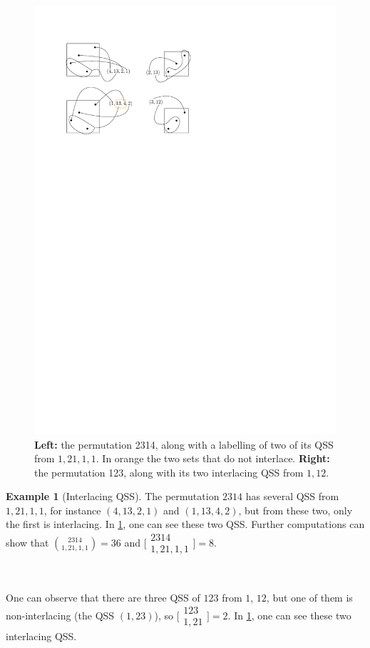 \documentclass[12pt, reqno]{amsart}
\theoremstyle{definition}
\newtheorem{smpl}[thm]{Example}
\begin{document}
\begin{figure}[h]
    \centering
    \includegraphics{../images/interlacing_25314_square.pdf}
    \caption{\textbf{Left:} the permutation 2314, along with a labelling of two of its QSS from $1, 21, 1, 1$. In orange the two sets that do not interlace. \textbf{Right:} the permutation 123, along with its two interlacing QSS from $1, 12$.\label{fig:interlacingQSSsmpl}}
\end{figure}


\begin{smpl}[Interlacing QSS]
The permutation $2314$ has several QSS from $1, 21, 1, 1$, for instance $(4, 13, 2, 1)$ and $(1, 13, 4, 2)$, but from these two, only the first is interlacing.
In \cref{fig:interlacingQSSsmpl}, one can see these two QSS.
Further computations can show that $\binom{2314}{1, 21, 1, 1} = 36$ and $\bigl[\!\begin{smallmatrix} 2314 \\ 1, 21, 1, 1 \end{smallmatrix}\!\bigr] = 8$.

\

One can observe that there are three QSS of $123$ from $1$, $12$, but one of them is non-interlacing (the QSS $(1,23)$), so
$\bigl[\!\begin{smallmatrix} 123 \\ 1, 21 \end{smallmatrix}\!\bigr] = 2$.
In \cref{fig:interlacingQSSsmpl}, one can see these two interlacing QSS.
\end{smpl}
\end{document}

